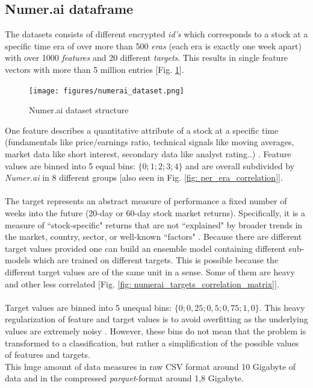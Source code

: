 \documentclass[12pt, a4paper]{article}
\begin{document}
\subsection{Numer.ai dataframe}
The datasets consists of different encrypted \textit{id's} which corresponds to a stock at a specific time era of over more than 500 \textit{eras} (each era is exactly one week apart) with over 1000 \textit{features} and 20 different \textit{targets}. This results in single feature vectors with more than 5 million entries  [Fig. \ref{fig: numerai_dataset}].
\begin{figure}[!htpb]
    \centering
    \texttt{[image: figures/numerai\_dataset.png]}
    \caption[Numer.ai dataset structure]{Numer.ai dataset structure \cite{Numerai}}
    \label{fig: numerai_dataset}
\end{figure}
One feature describes a quantitative attribute of a stock at a specific time (fundamentals like price/earnings ratio, technical signals like moving averages, market data like short interest, secondary data like analyst rating..) \cite{Numerai}.
Feature values are binned into 5 equal bins: $\{0;1;2;3;4\}$ and are overall subdivided by \textit{Numer.ai} in 8 different groups [also seen in Fig. \ref{fig: per_era_correlation}]. \\
\\
The target represents an abstract measure of performance a fixed number of weeks into the future (20-day or 60-day stock market returns). Specifically, it is a measure of ``stock-specific" returns that are not ``explained" by broader trends in the market, country, sector, or well-known ``factors" \cite{Numerai}. Because there are different target values provided one can build an ensemble model containing different sub-models which are trained on different targets. This is possible because the different target values are of the same unit in a sense. Some of them are heavy and other less correlated [Fig. \ref{fig: numerai_targets_correlation_matrix}]. \\
\\
Target values are binned into 5 unequal bins: $\{0; 0{,}25; 0{,}5; 0{,}75; 1{,}0\}$. This heavy regularization of feature and target values is to avoid overfitting as the underlying values are extremely noisy \cite{Numerai}. However, these bins do not mean that the problem is transformed to a classification, but rather a simplification of the possible values of features and targets. \\
This huge amount of data measures in raw CSV format around 10 Gigabyte of data and in the compressed \textit{parquet}-format around 1,8 Gigabyte. \\
\end{document}

